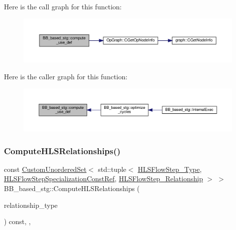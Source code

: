 Here is the call graph for this function\+:
\nopagebreak
\begin{figure}[H]
\begin{center}
\leavevmode
\includegraphics[width=350pt]{dd/d84/classBB__based__stg_af5a6daf4d51de5aa9b2aa18eba16c5d1_cgraph}
\end{center}
\end{figure}
Here is the caller graph for this function\+:
\nopagebreak
\begin{figure}[H]
\begin{center}
\leavevmode
\includegraphics[width=350pt]{dd/d84/classBB__based__stg_af5a6daf4d51de5aa9b2aa18eba16c5d1_icgraph}
\end{center}
\end{figure}
\mbox{\label{classBB__based__stg_aea701ad71c3a60c0f6abe3a7f0ca38c9}} 
\subsubsection{\texorpdfstring{Compute\+H\+L\+S\+Relationships()}{ComputeHLSRelationships()}}
{\footnotesize\ttfamily const \hyperlink{classCustomUnorderedSet}{Custom\+Unordered\+Set}$<$ std\+::tuple$<$ \hyperlink{hls__step_8hpp_ada16bc22905016180e26fc7e39537f8d}{H\+L\+S\+Flow\+Step\+\_\+\+Type}, \hyperlink{hls__step_8hpp_a5fdd2edf290c196531d21d68e13f0e74}{H\+L\+S\+Flow\+Step\+Specialization\+Const\+Ref}, \hyperlink{hls__step_8hpp_a3ad360b9b11e6bf0683d5562a0ceb169}{H\+L\+S\+Flow\+Step\+\_\+\+Relationship} $>$ $>$ B\+B\+\_\+based\+\_\+stg\+::\+Compute\+H\+L\+S\+Relationships (\begin{DoxyParamCaption}\item[{const \hyperlink{classDesignFlowStep_a723a3baf19ff2ceb77bc13e099d0b1b7}{Design\+Flow\+Step\+::\+Relationship\+Type}}]{relationship\+\_\+type }\end{DoxyParamCaption}) const\hspace{0.3cm}{\ttfamily [override]}, {\ttfamily [protected]}, {\ttfamily [virtual]}}



